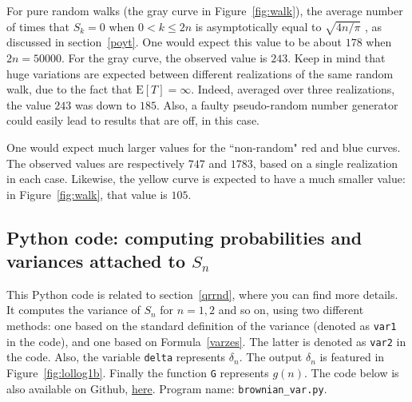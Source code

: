 \documentclass[oneside,10pt]{book}
\begin{document}
For pure random walks (the gray curve in Figure~\ref{fig:walk}), the average number of times that $S_k=0$ when $0<k\leq 2n$
 is asymptotically equal to $\sqrt{4n/\pi}$ , as discussed in section~\ref{poyt}. One would expect this value to be about $178$
 when $2n=\num{50000}$. For the gray curve, the observed value is $243$. Keep in mind that huge variations are expected between different realizations of the same random walk, due to the fact that $\text{E}[T]=\infty$. Indeed, averaged over three realizations, the value $243$ was down to 
$185$. Also, a faulty pseudo-random number generator could easily lead to results that are off, in this case.

One would expect much larger 
 values for the ``non-random" red and blue curves. The observed 
values are respectively $747$ and $1783$, based on a single realization in each case. Likewise, the yellow curve is expected to have a much smaller value: in Figure~\ref{fig:walk}, 
that value is $105$.

\subsection{Python code: computing probabilities and variances attached to $S_n$}\label{pypy1bv}

This Python code is related to section~\ref{qrrnd}, where you can find more details.
It computes the variance of $S_n$ for $n=1, 2$ and so on, using two different methods:
 one based on the standard definition of the variance (denoted as \texttt{var1} in the code), and one based 
 on Formula~\ref{varzes}. The latter is denoted as \texttt{var2} in the code.  Also, the variable \texttt{delta}
 represents $\delta_n$. The output $\delta_n$ is featured in Figure~\ref{fig:lollog1b}.  Finally the function \texttt{G} represents $g(n)$. 
The code below is also available on Github, \href{https://github.com/VincentGranville/Machine-Learning/blob/main/Source\%20Code/brownian_var.py}{here}. 
Program name: \texttt{brownian\_var.py}. \\

\end{document}
